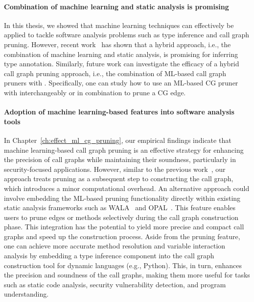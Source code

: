 \paragraph{Combination of machine learning and static analysis is promising} In this thesis, we showed that machine learning techniques can effectively be applied to tackle software analysis problems such as type inference and call graph pruning. However, recent work~\cite{peng2022static} has shown that a hybrid approach, i.e., the combination of machine learning and static analysis, is promising for inferring type annotation. Similarly, future work can investigate the efficacy of a hybrid call graph pruning approach, i.e., the combination of ML-based call graph pruners with . Specifically, one can study how to use an ML-based CG pruner with  interchangeably or in combination to prune a CG edge.

\paragraph{Adoption of machine learning-based features into software analysis tools} In Chapter~\ref{ch:effect_ml_cg_pruning}, our empirical findings indicate that machine learning-based call graph pruning is an effective strategy for enhancing the precision of call graphs while maintaining their soundness, particularly in security-focused applications. However, similar to the previous work~\cite{le2022autopruner, utture2022striking}, our approach treats pruning as a subsequent step to constructing the call graph, which introduces a minor computational overhead. An alternative approach could involve embedding the ML-based pruning functionality directly within existing static analysis frameworks such as WALA~\cite{fink2012wala} and OPAL~\cite{eichberg2014software}. This feature enables users to prune edges or methods selectively during the call graph construction phase. This integration has the potential to yield more precise and compact call graphs and speed up the construction process. Aside from the pruning feature, one can achieve more accurate method resolution and variable interaction analysis by embedding a type inference component into the call graph construction tool for dynamic languages (e.g., Python). This, in turn, enhances the precision and soundness of the call graphs, making them more useful for tasks such as static code analysis, security vulnerability detection, and program understanding.

